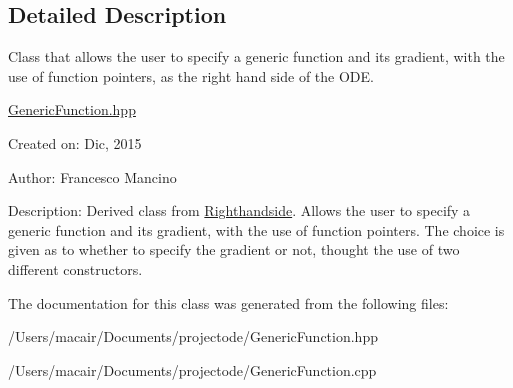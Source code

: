 \subsection{Detailed Description}
Class that allows the user to specify a generic function and its gradient, with the use of function pointers, as the right hand side of the O\+D\+E. 

\hyperlink{_generic_function_8hpp_source}{Generic\+Function.\+hpp}

Created on\+: Dic, 2015 \begin{DoxyVerb}Author: Francesco Mancino
\end{DoxyVerb}


Description\+: Derived class from \hyperlink{class_righthandside}{Righthandside}. Allows the user to specify a generic function and its gradient, with the use of function pointers. The choice is given as to whether to specify the gradient or not, thought the use of two different constructors. 

The documentation for this class was generated from the following files\+:\begin{DoxyCompactItemize}
\item 
/\+Users/macair/\+Documents/projectode/Generic\+Function.\+hpp\item 
/\+Users/macair/\+Documents/projectode/Generic\+Function.\+cpp\end{DoxyCompactItemize}
